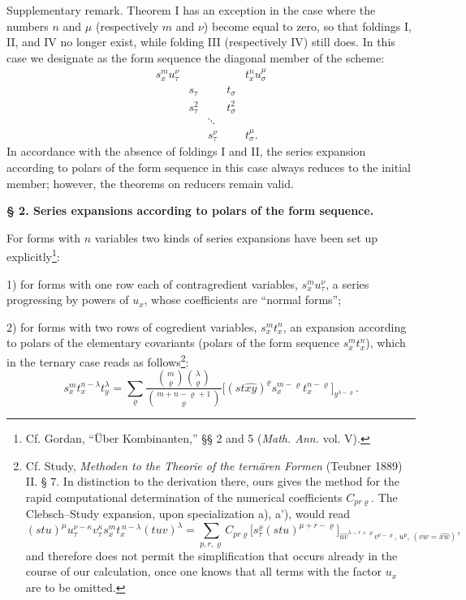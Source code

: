\documentclass[11pt]{article}
\begin{document}
Supplementary remark. Theorem I has an exception in the case where the numbers $n$ and $\mu$ (respectively $m$ and $\nu$) become equal to zero, so that foldings I, II, and IV no longer exist, while folding III (respectively IV) still does. In this case we designate as the form sequence the diagonal member of the scheme:
\[
\begin{array}{ccccc}
s_x^m u_\tau^\nu &&&& t_x^n u_\sigma^\mu\\
& s_\tau && t_\sigma &\\
& s_\tau^2 && t_\sigma^2 &\\
&&\ddots&&\\
&&s_\tau^\nu && t_\sigma^\mu .
\end{array}
\]
In accordance with the absence of foldings I and II, the series expansion according to polars of the form sequence in this case always reduces to the initial member; however, the theorems on reducers remain valid.

\begin{center}
\textbf{§ 2. \quad Series expansions according to polars of the form sequence.}
\end{center}

For forms with $n$ variables two kinds of series expansions have been set up explicitly\footnote{Cf. Gordan, ``Über Kombinanten,'' §§ 2 and 5 (\emph{Math. Ann.} vol. V).}:

1) for forms with one row each of contragredient variables, $s_x^m u_\tau^\nu$, a series progressing by powers of $u_x$, whose coefficients are ``normal forms'';

2) for forms with two rows of cogredient variables, $s_x^m t_x^n$, an expansion according to polars of the elementary covariants (polars of the form sequence $s_x^m t_x^n$), which in the ternary case reads as follows\footnote{Cf. Study, \emph{Methoden to the Theorie of the ternären Formen} (Teubner 1889) II. § 7. In distinction to the derivation there, ours gives the method for the rapid computational determination of the numerical coefficients $C_{pr\varrho}$. The Clebsch--Study expansion, upon specialization a), a'), would read
\[
(stu)^\mu u_\tau^{\nu-\kappa}v_\tau^\kappa s_x^m t_x^{\,n-\lambda}(tuv)^\lambda
=\sum_{p,r,\varrho} C_{pr\varrho}
\bigl[s_\tau^\varrho(stu)^{\mu+r-\varrho}\bigr]_{\widehat{uv}^{\lambda-r+\varrho}v^{\nu-\varrho},\,u^p,\,(vw=\widehat{xw})},
\]
and therefore does not permit the simplification that occurs already in the course of our calculation, once one knows that all terms with the factor $u_x$ are to be omitted.}:
\[
\tag{I}
s_x^m t_x^{n-\lambda}t_y^\lambda
=\sum_{\varrho}
\frac{\binom{m}{\varrho}\binom{\lambda}{\varrho}}
{\binom{m+n-\varrho+1}{\varrho}}
\bigl[(st\widehat{xy})^\varrho s_x^{m-\varrho}t_x^{n-\varrho}\bigr]_{y^{\lambda-\varrho}}.
\]
\end{document}
